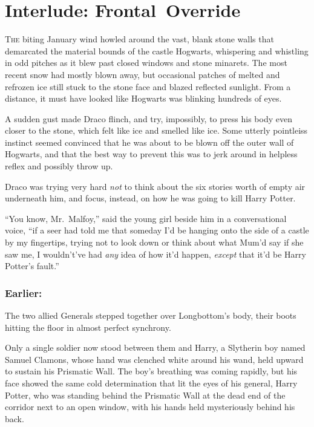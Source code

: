 \chapter[Interlude: Frontal~Override]{Interlude: Frontal~Override}

\lettrine{T}{he} biting January wind howled around the vast, blank stone walls that demarcated the material bounds of the castle Hogwarts, whispering and whistling in odd pitches as it blew past closed windows and stone minarets. The most recent snow had mostly blown away, but occasional patches of melted and refrozen ice still stuck to the stone face and blazed reflected sunlight. From a distance, it must have looked like Hogwarts was blinking hundreds of eyes.

A sudden gust made Draco flinch, and try, impossibly, to press his body even closer to the stone, which felt like ice and smelled like ice. Some utterly pointleiss instinct seemed convinced that he was about to be blown off the outer wall of Hogwarts, and that the best way to prevent this was to jerk around in helpless reflex and possibly throw up.

Draco was trying very hard \emph{not} to think about the six stories worth of empty air underneath him, and focus, instead, on how he was going to kill Harry Potter.

“You know, Mr.~Malfoy,” said the young girl beside him in a conversational voice, “if a seer had told me that someday I’d be hanging onto the side of a castle by my fingertips, trying not to look down or think about what Mum’d say if she saw me, I wouldn’t’ve had \emph{any} idea of how it’d happen, \emph{except} that it’d be Harry Potter’s fault.”
\replacement{\sbreak}{}

\subsection{Earlier:}
The two allied Generals stepped together over Longbottom’s body, their boots hitting the floor in almost perfect synchrony.

Only a single soldier now stood between them and Harry, a Slytherin boy named Samuel Clamons, whose hand was clenched white around his wand, held upward to sustain his Prismatic Wall. The boy’s breathing was coming rapidly, but his face showed the same cold determination that lit the eyes of his general, Harry Potter, who was standing behind the Prismatic Wall at the dead end of the corridor next to an open window, with his hands held mysteriously behind his back.


